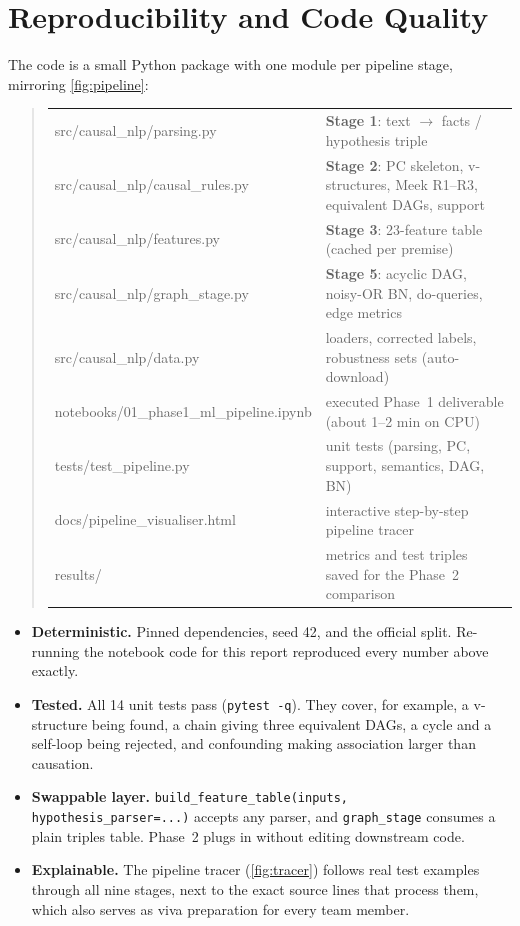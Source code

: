 \documentclass[12pt,a4paper]{article}
\newenvironment{examplebox}{\begin{quote}}{\end{quote}}
\newcommand{\code}[1]{\texttt{#1}}
\begin{document}
\section{Reproducibility and Code Quality}\label{sec:repro}

The code is a small Python package with one module per pipeline stage, mirroring \cref{fig:pipeline}:

\begin{examplebox}
\footnotesize
\begin{tabularx}{\linewidth}{@{}>{\ttfamily}l@{\hspace{1.2em}}>{\raggedright\arraybackslash}X@{}}
src/causal\_nlp/parsing.py      & \textbf{Stage 1}: text $\rightarrow$ facts / hypothesis triple \\
src/causal\_nlp/causal\_rules.py & \textbf{Stage 2}: PC skeleton, v-structures, Meek R1--R3, equivalent DAGs, support \\
src/causal\_nlp/features.py     & \textbf{Stage 3}: 23-feature table (cached per premise) \\
src/causal\_nlp/graph\_stage.py  & \textbf{Stage 5}: acyclic DAG, noisy-OR BN, do-queries, edge metrics \\
src/causal\_nlp/data.py         & loaders, corrected labels, robustness sets (auto-download) \\
notebooks/01\_phase1\_ml\_pipeline.ipynb & executed Phase~1 deliverable (about 1--2 min on CPU) \\
tests/test\_pipeline.py         & 14 unit tests (parsing, PC, support, semantics, DAG, BN) \\
docs/pipeline\_visualiser.html  & interactive step-by-step pipeline tracer \\
results/                        & metrics and test triples saved for the Phase~2 comparison \\
\end{tabularx}
\end{examplebox}

\begin{itemize}
  \item \textbf{Deterministic.} Pinned dependencies, seed 42, and the official split. Re-running the notebook code for this
        report reproduced every number above exactly.
  \item \textbf{Tested.} All 14 unit tests pass (\code{pytest -q}). They cover, for example, a v-structure being found, a chain giving
        three equivalent DAGs, a cycle and a self-loop being rejected, and confounding making association larger than causation.
  \item \textbf{Swappable layer.} \code{build\_feature\_table(inputs, hypothesis\_parser=...)} accepts any parser, and
        \code{graph\_stage} consumes a plain triples table. Phase~2 plugs in without editing downstream code.
  \item \textbf{Explainable.} The pipeline tracer (\cref{fig:tracer}) follows real test examples through all nine stages, next to
        the exact source lines that process them, which also serves as viva preparation for every team member.
\end{itemize}
\end{document}
